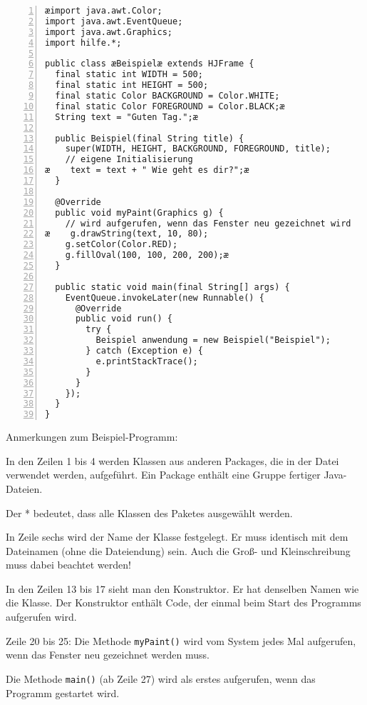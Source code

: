 \begin{lstlisting}[numbers=left, xleftmargin=7mm]
æimport java.awt.Color;
import java.awt.EventQueue;
import java.awt.Graphics;
import hilfe.*;

public class æBeispielæ extends HJFrame {
  final static int WIDTH = 500;
  final static int HEIGHT = 500;
  final static Color BACKGROUND = Color.WHITE;
  final static Color FOREGROUND = Color.BLACK;æ
  String text = "Guten Tag.";æ

  public Beispiel(final String title) {
    super(WIDTH, HEIGHT, BACKGROUND, FOREGROUND, title);
    // eigene Initialisierung
æ    text = text + " Wie geht es dir?";æ
  }

  @Override
  public void myPaint(Graphics g) {
    // wird aufgerufen, wenn das Fenster neu gezeichnet wird 
æ    g.drawString(text, 10, 80);
    g.setColor(Color.RED);
    g.fillOval(100, 100, 200, 200);æ
  }

  public static void main(final String[] args) {
    EventQueue.invokeLater(new Runnable() {
      @Override
      public void run() {
        try {
          Beispiel anwendung = new Beispiel("Beispiel");
        } catch (Exception e) {
          e.printStackTrace();
        }
      }
    });
  }
}
\end{lstlisting}

Anmerkungen zum Beispiel-Programm:

\begin{compactitem}
\item In den Zeilen 1 bis 4 werden Klassen aus anderen Packages, die in der
Datei verwendet werden, aufgeführt. Ein Package enthält eine Gruppe fertiger
Java-Dateien.

Der * bedeutet, dass alle Klassen des Paketes ausgewählt werden.

\item In Zeile sechs wird der Name der Klasse festgelegt. Er muss identisch mit
dem Dateinamen (ohne die  Dateiendung) sein. Auch die Groß- und
Kleinschreibung muss dabei beachtet werden!

\item In den Zeilen 13 bis 17 sieht man den Konstruktor. Er hat denselben
Namen wie die Klasse. Der Konstruktor enthält Code, der einmal
beim Start des Programms aufgerufen wird.

\item Zeile 20 bis 25: Die Methode \lstinline|myPaint()| wird vom
System jedes Mal aufgerufen, wenn das Fenster neu gezeichnet
werden muss.

\item Die Methode \lstinline|main()| (ab Zeile 27) wird als erstes aufgerufen,
wenn das Programm gestartet wird.
\end{compactitem}


